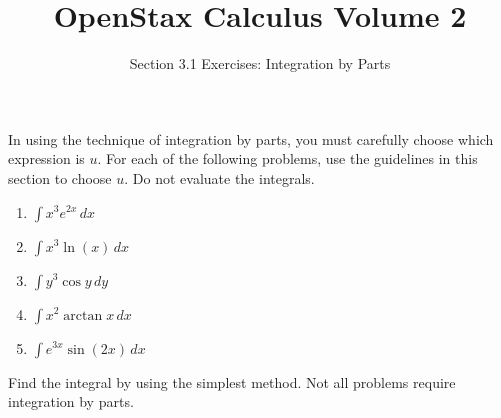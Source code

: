 \documentclass{exercises}
\title{OpenStax Calculus Volume 2}
\subtitle{Section 3.1 Exercises: Integration by Parts}
\author{}
\date{}
\begin{document}
\maketitle


In using the technique of integration by parts, you must carefully choose which expression is $u$. For each of the following problems, use the guidelines in this section to choose $u$. Do not evaluate the integrals.

\begin{enumerate}[start=1]
\item $\int x^{3}e^{2x}\,dx$
\item $\int x^{3}\ln(x)\,dx$
\item $\int y^{3}\cos y\,dy$
\item $\int x^{2}\arctan x\,dx$
\item $\int e^{3x}\sin(2x)\,dx$
\end{enumerate}

Find the integral by using the simplest method. Not all problems require integration by parts.
\end{document}

